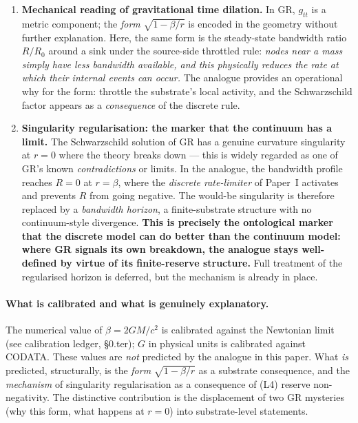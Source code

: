 \documentclass[11pt,a4paper]{article}
\begin{document}
\begin{enumerate}
\item \textbf{Mechanical reading of gravitational time
dilation.} In GR, $g_{tt}$ is a metric component; the
\emph{form} $\sqrt{1-\beta/r}$ is encoded in the geometry
without further explanation. Here, the same form is the
steady-state bandwidth ratio $R/R_0$ around a sink under the
source-side throttled rule: \emph{nodes near a mass simply have
less bandwidth available, and this physically reduces the rate
at which their internal events can occur.} The analogue
provides an operational why for the form: throttle the
substrate's local activity, and the Schwarzschild factor
appears as a \emph{consequence} of the discrete rule.

\item \textbf{Singularity regularisation: the marker that the
continuum has a limit.} The Schwarzschild solution of GR has a
genuine curvature singularity at $r = 0$ where the theory
breaks down --- this is widely regarded as one of GR's known
\emph{contradictions} or limits. In the analogue, the
bandwidth profile reaches $R = 0$ at $r = \beta$, where the
\emph{discrete rate-limiter} of Paper~I activates and prevents
$R$ from going negative. The would-be singularity is therefore
replaced by a \emph{bandwidth horizon}, a finite-substrate
structure with no continuum-style divergence. \textbf{This is
precisely the ontological marker that the discrete model can do
better than the continuum model: where GR signals its own
breakdown, the analogue stays well-defined by virtue of its
finite-reserve structure.} Full treatment of the regularised
horizon is deferred, but the mechanism is already in place.
\end{enumerate}

\paragraph{What is calibrated and what is genuinely
explanatory.} The numerical value of $\beta = 2GM/c^2$ is
calibrated against the Newtonian limit (see calibration
ledger, §0.ter); $G$ in physical units is calibrated against
CODATA. These values are \emph{not} predicted by the analogue
in this paper. What \emph{is} predicted, structurally, is the
\emph{form} $\sqrt{1-\beta/r}$ as a substrate consequence, and
the \emph{mechanism} of singularity regularisation as a
consequence of (L4) reserve non-negativity. The distinctive
contribution is the displacement of two GR mysteries (why this
form, what happens at $r = 0$) into substrate-level statements.
\end{document}
